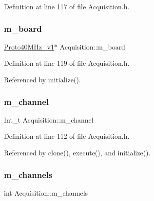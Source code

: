 Definition at line 117 of file Acquisition.\+h.

\mbox{\label{classAcquisition_a9b0db99be79d61ae78dae8a9e4efceab}} 
\subsubsection{\texorpdfstring{m\+\_\+board}{m\_board}\hspace{0.1cm}{\footnotesize\ttfamily [2/2]}}
{\footnotesize\ttfamily \hyperlink{classProto40MHz__v1}{Proto40\+M\+Hz\+\_\+v1}$\ast$ Acquisition\+::m\+\_\+board\hspace{0.3cm}{\ttfamily [private]}}



Definition at line 119 of file Acquisition.\+h.



Referenced by initialize().

\mbox{\label{classAcquisition_a9233a189179591c0c2f2639a3e6c13f6}} 
\subsubsection{\texorpdfstring{m\+\_\+channel}{m\_channel}}
{\footnotesize\ttfamily Int\+\_\+t Acquisition\+::m\+\_\+channel\hspace{0.3cm}{\ttfamily [private]}}



Definition at line 112 of file Acquisition.\+h.



Referenced by clone(), execute(), and initialize().

\mbox{\label{classAcquisition_aedc8b29f322ef00540797fbd0d5112d1}} 
\subsubsection{\texorpdfstring{m\+\_\+channels}{m\_channels}}
{\footnotesize\ttfamily int Acquisition\+::m\+\_\+channels\hspace{0.3cm}{\ttfamily [private]}}



